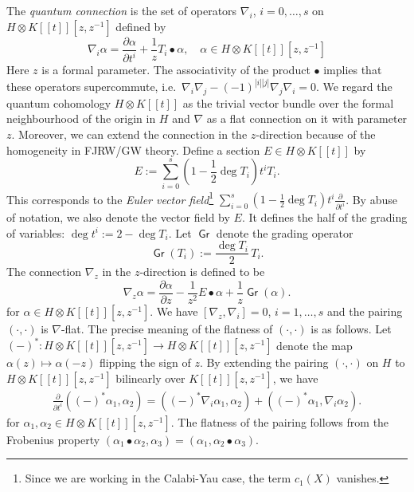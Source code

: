 \documentclass[11pt]{amsart}
\theoremstyle{definition} %
\theoremstyle{remark} %
\def\parfrac#1#2{\frac{\partial #1}{\partial #2}}
\newcommand{\grading}{\operatorname{\mathsf{Gr}}} %
\begin{document}
The \emph{quantum connection} is  
the set of operators 
$\nabla_i$, $i=0,\dots,s$ on $H\otimes K[\![t]\!][z,z^{-1}]$ 
defined by 
\begin{equation} 
\label{eq:quantum-conn} 
\nabla_i \alpha = \parfrac{\alpha}{t^i} 
+ \frac{1}{z} T_i \bullet \alpha, \quad 
\alpha \in H\otimes K[\![t]\!][z,z^{-1}] 
\end{equation} 
Here $z$ is a formal parameter. 
The associativity of the product $\bullet$ implies that 
these operators supercommute, i.e.\ 
$\nabla_i \nabla_j - (-1)^{|i||j|} \nabla_j \nabla_i =0$. 
We regard the quantum cohomology $H\otimes K[\![t]\!]$ 
as the trivial vector bundle over the formal neighbourhood 
of the origin in $H$ and $\nabla$ as a flat connection on it 
with parameter $z$. 
Moreover, we can extend the connection in the 
$z$-direction because of the homogeneity in 
FJRW/GW theory. 
Define a section $E\in H\otimes K[\![t]\!]$ by 
\[
E := \sum_{i=0}^s \left(1-\frac{1}{2} \deg T_i\right) 
t^i T_i.  
\]
This corresponds to the \emph{Euler vector field}\footnote
{Since we are working in the Calabi-Yau case, 
the term $c_1(X)$ vanishes.} 
$\sum_{i=0}^s \left(1-\frac{1}{2} \deg T_i\right) 
t^i \parfrac{}{t^i}$. By abuse of notation, 
we also denote the vector field by $E$. 
It defines the half of the grading of variables: 
$\deg t^i := 2 - \deg T_i$. 
Let $\grading$ denote the grading operator  
\[
\grading(T_i) := \frac{\deg T_i}{2}\, T_i.  
\]
The connection $\nabla_{z}$ in the $z$-direction 
is defined to be  
\[
\nabla_{z}\alpha  = \parfrac{\alpha}{z} - 
\frac{1}{z^2} E\bullet \alpha
+ \frac{1}{z} \grading(\alpha). 
\]
for $\alpha\in H\otimes K[\![t]\!][z,z^{-1}]$. 
We have $[\nabla_z,\nabla_i]=0$, $i=1,\dots,s$ 
and the pairing $(\cdot,\cdot)$ is $\nabla$-flat. 
The precise meaning of the flatness of $(\cdot,\cdot)$ is as follows. 
Let $(-)^* \colon H \otimes K[\![t]\!][z,z^{-1}] \to 
H \otimes K[\![t]\!][z,z^{-1}]$ denote the map 
$\alpha(z) \mapsto \alpha(-z)$ flipping the sign of $z$. 
By extending the pairing $(\cdot,\cdot)$ on $H$ 
to $H\otimes K[\![t]\!][z,z^{-1}]$ 
bilinearly over $K[\![t]\!][z,z^{-1}]$, we have 
\begin{align}
\label{eq:flatness-pairing}  
\parfrac{}{t^i} \left((-)^*\alpha_1,\alpha_2\right) 
 = 
\left((-)^* \nabla_i \alpha_1, \alpha_2\right) + 
\left((-)^*\alpha_1, \nabla_i \alpha_2\right).  
\end{align} 
for $\alpha_1,\alpha_2 \in  H\otimes K[\![t]\!][z,z^{-1}]$. 
The flatness of the pairing follows from the Frobenius property 
$(\alpha_1 \bullet \alpha_2, \alpha_3) = 
(\alpha_1, \alpha_2 \bullet \alpha_3)$. 
\end{document}
